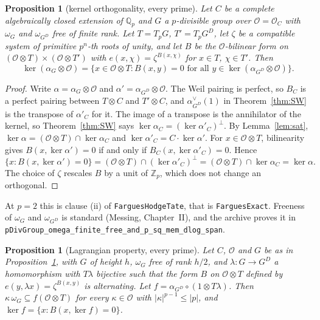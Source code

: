 \documentclass[11pt]{article}
\newcommand{\lean}[1]{\nolinkurl{#1}}
\newtheorem{proposition}[theorem]{Proposition}
\theoremstyle{definition}
\theoremstyle{remark}
\newcommand{\cO}{\mathcal O}
\begin{document}
\begin{proposition}[kernel orthogonality, every prime]\label{prop:B}
Let $C$ be a complete algebraically closed extension of $\mathbb Q_p$ and $G$ a $p$-divisible group over $\cO=\cO_C$ with $\omega_G$ and $\omega_{G^D}$ free of finite rank. Let $T=T_pG$, $T'=T_pG^D$, let $\zeta$ be a compatible system of primitive $p^n$-th roots of unity, and let $B$ be the $\cO$-bilinear form on $(\cO\otimes T)\times(\cO\otimes T')$ with $e(x,\chi)=\zeta^{B(x,\chi)}$ for $x\in T$, $\chi\in T'$. Then
\[
\ker(\alpha_G\otimes\cO)=\{x\in\cO\otimes T : B(x,y)=0\text{ for all }y\in\ker(\alpha_{G^D}\otimes\cO)\}.
\]
\end{proposition}

\begin{proof}
Write $\alpha=\alpha_G\otimes\cO$ and $\alpha'=\alpha_{G^D}\otimes\cO$. The Weil pairing is perfect, so $B_C$ is a perfect pairing between $T\otimes C$ and $T'\otimes C$, and $\alpha_{G^D}^\vee(1)$ in Theorem~\ref{thm:SW} is the transpose of $\alpha'_C$ for it. The image of a transpose is the annihilator of the kernel, so Theorem~\ref{thm:SW} says $\ker\alpha_C=(\ker\alpha'_C)^\perp$. By Lemma~\ref{lem:sat}, $\ker\alpha=(\cO\otimes T)\cap\ker\alpha_C$ and $\ker\alpha'_C=C\cdot\ker\alpha'$. For $x\in\cO\otimes T$, bilinearity gives $B(x,\ker\alpha')=0$ if and only if $B_C(x,\ker\alpha'_C)=0$. Hence
\[
\{x : B(x,\ker\alpha')=0\}=(\cO\otimes T)\cap(\ker\alpha'_C)^\perp=(\cO\otimes T)\cap\ker\alpha_C=\ker\alpha .
\]
The choice of $\zeta$ rescales $B$ by a unit of $\mathbb Z_p$, which does not change an orthogonal.
\end{proof}

At $p=2$ this is clause (ii) of \lean{FarguesHodgeTate}, that is \lean{FarguesExact}. Freeness of $\omega_G$ and $\omega_{G^D}$ is standard (Messing, Chapter~II), and the archive proves it in \lean{pDivGroup_omega_finite_free_and_p_sq_mem_dlog_span}.

\begin{proposition}[Lagrangian property, every prime]\label{prop:C}
Let $C$, $\cO$ and $G$ be as in Proposition~\ref{prop:B}, with $G$ of height $h$, $\omega_G$ free of rank $h/2$, and $\lambda\colon G\to G^D$ a homomorphism with $T\lambda$ bijective such that the form $B$ on $\cO\otimes T$ defined by $e(y,\lambda x)=\zeta^{B(x,y)}$ is alternating. Let $f=\alpha_{G^D}\circ(1\otimes T\lambda)$. Then $\kappa\,\omega_G\subseteq f(\cO\otimes T)$ for every $\kappa\in\cO$ with $\lvert\kappa\rvert^{p-1}\le\lvert p\rvert$, and $\ker f=\{x : B(x,\ker f)=0\}$.
\end{proposition}
\end{document}

